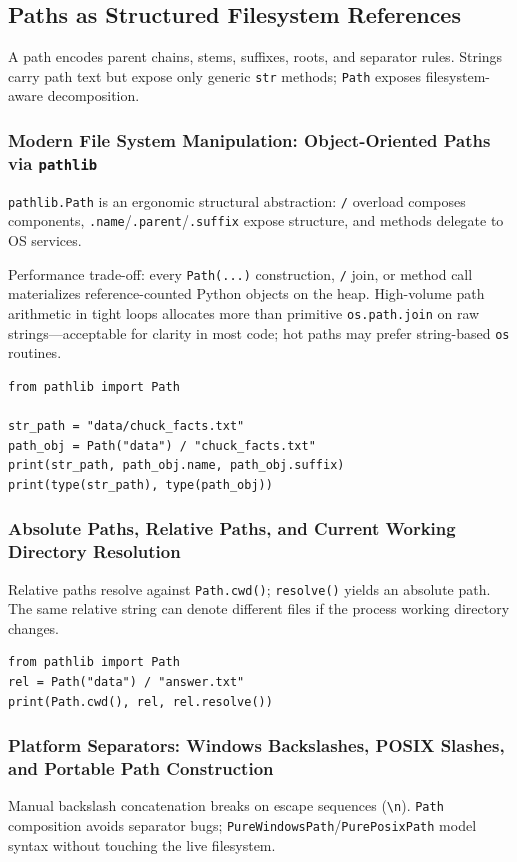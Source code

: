\subsection{Paths as Structured Filesystem References}

A path encodes parent chains, stems, suffixes, roots, and separator rules. Strings carry path text but expose only generic \texttt{str} methods; \texttt{Path} exposes filesystem-aware decomposition.

\subsubsection{Modern File System Manipulation: Object-Oriented Paths via \texttt{pathlib}}

\texttt{pathlib.Path} is an ergonomic structural abstraction: \texttt{/} overload composes components, \texttt{.name}/\texttt{.parent}/\texttt{.suffix} expose structure, and methods delegate to OS services.

Performance trade-off: every \texttt{Path(...)} construction, \texttt{/} join, or method call materializes reference-counted Python objects on the heap. High-volume path arithmetic in tight loops allocates more than primitive \texttt{os.path.join} on raw strings---acceptable for clarity in most code; hot paths may prefer string-based \texttt{os} routines.

\begin{verbatim}
from pathlib import Path

str_path = "data/chuck_facts.txt"
path_obj = Path("data") / "chuck_facts.txt"
print(str_path, path_obj.name, path_obj.suffix)
print(type(str_path), type(path_obj))
\end{verbatim}

\subsubsection{Absolute Paths, Relative Paths, and Current Working Directory Resolution}

Relative paths resolve against \texttt{Path.cwd()}; \texttt{resolve()} yields an absolute path. The same relative string can denote different files if the process working directory changes.

\begin{verbatim}
from pathlib import Path
rel = Path("data") / "answer.txt"
print(Path.cwd(), rel, rel.resolve())
\end{verbatim}

\subsubsection{Platform Separators: Windows Backslashes, POSIX Slashes, and Portable Path Construction}

Manual backslash concatenation breaks on escape sequences (\texttt{\textbackslash n}). \texttt{Path} composition avoids separator bugs; \texttt{PureWindowsPath}/\texttt{PurePosixPath} model syntax without touching the live filesystem.
